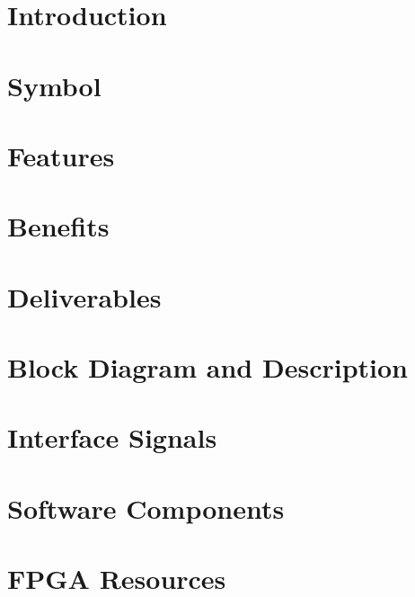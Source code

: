\documentclass{../../submodules/TEX/document/ug/ug}
\begin{document}
\maketitle
\cleardoublepage
\tableofcontents
\listoftables
\listoffigures
\cleardoublepage

\section{Introduction}


\section{Symbol}


\section{Features}


\section{Benefits}


\section{Deliverables}


\section{Block Diagram and Description}


\section{Interface Signals}


\ifnum{}

\fi


\ifnum{}

\fi

\ifnum{}

\fi

\section{Software Components}
\ifnum{}

\fi

\section*{FPGA Resources}


%
%
\end{document}
